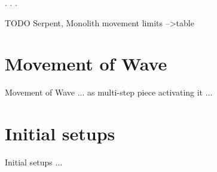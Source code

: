 . . .

\clearpage %

\huge{TODO}
Serpent, Monolith movement limits --\textgreater table
\normalsize{}

\clearpage %

\section*{Movement of Wave}
\label{sec:Appendix/Movement of Wave}

Movement of Wave ... as multi-step piece activating it  ...


\clearpage %

\section*{Initial setups}
\label{sec:Appendix/Initial setups}
Initial setups ...






